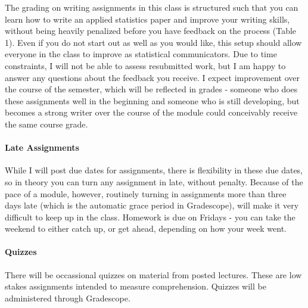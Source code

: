 \documentclass[11pt]{article}
\begin{document}
The grading on writing assignments in this class is structured such that you can learn how to write an applied statistics paper and improve your writing skills, without being heavily penalized before you have feedback on the process (Table 1). Even if you do not start out as well as you would like, this setup should allow everyone in the class to improve as statistical communicators. Due to time constraints, I will not be able to assess resubmitted work, but I am happy to answer any questions about the feedback you receive. I expect improvement over the course of the semester, which will be reflected in grades - someone who does these assignments well in the beginning and someone who is still developing, but becomes a strong writer over the course of the module could conceivably receive the same course grade.

\paragraph{Late Assignments} 
While I will post due dates for assignments, there is flexibility in these due dates, so in theory you can turn any assignment in late, without penalty. Because of the pace of a module, however, routinely turning in assignments more than three days late (which is the automatic grace period in Gradescope), will make it very difficult to keep up in the class. Homework is due on Fridays - you can take the weekend to either catch up, or get ahead, depending on how your week went.

\paragraph{Quizzes}
There will be occassional quizzes on material from posted lectures. These are low stakes assignments intended to measure comprehension. Quizzes will be administered through Gradescope. 
\end{document}
